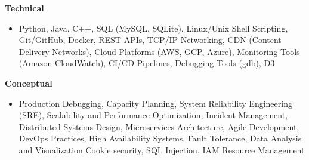 \textbf{Technical}
\begin{itemize}[leftmargin=1.5em, nosep, noitemsep] %
    \item[] 
    Python,
    Java,
    C++,
    SQL (MySQL, SQLite),
    Linux/Unix Shell Scripting,
    Git/GitHub,
    Docker,
    REST APIs,
    TCP/IP Networking,
    CDN (Content Delivery Networks),
    Cloud Platforms (AWS, GCP, Azure),
    Monitoring Tools (Amazon CloudWatch),
    CI/CD Pipelines,
    Debugging Tools (gdb),
    D3
\end{itemize}
\textbf{Conceptual}
\begin{itemize}[leftmargin=1.5em, nosep, noitemsep] %
    \item[]
    Production Debugging,
    Capacity Planning,
    System Reliability Engineering (SRE),
    Scalability and Performance Optimization,
    Incident Management,
    Distributed Systems Design,
    Microservices Architecture,
    Agile Development,
    DevOps Practices,
    High Availability Systems,
    Fault Tolerance,
    Data Analysis and Visualization
    Cookie security,
    SQL Injection,
    IAM Resource Management
\end{itemize}
